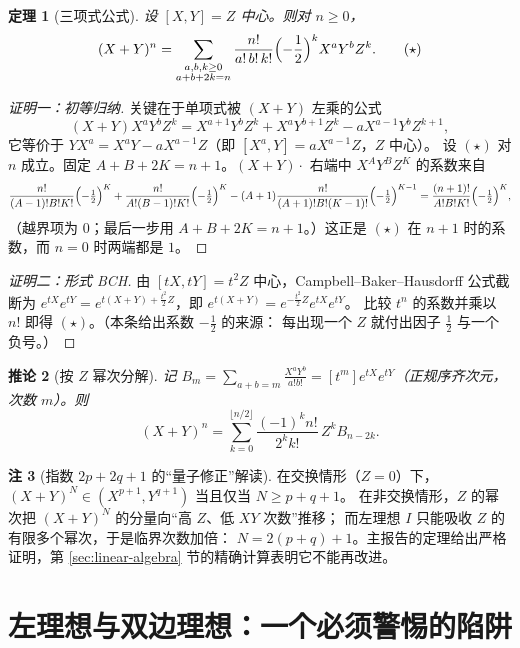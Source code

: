 \documentclass[11pt,UTF8]{ctexart}
\newtheorem{theorem}{定理}[section]
\newtheorem{corollary}[theorem]{推论}
\theoremstyle{definition}
\newtheorem{remark}[theorem]{注}
\begin{document}
\begin{theorem}[三项式公式]\label{thm:tri}
设 $[X,Y]=Z$ 中心。则对 $n\ge0$，
\[
(X+Y)^{n}=\sum_{\substack{a,b,k\ge0\\ a+b+2k=n}}\frac{n!}{a!\,b!\,k!}\Bigl(-\frac12\Bigr)^{k}X^{a}Y^{b}Z^{k}.
\tag{$\star$}
\]
\end{theorem}

\begin{proof}[证明一：初等归纳]
关键在于单项式被 $(X+Y)$ 左乘的公式
\[
(X+Y)X^{a}Y^{b}Z^{k}=X^{a+1}Y^{b}Z^{k}+X^{a}Y^{b+1}Z^{k}-aX^{a-1}Y^{b}Z^{k+1},
\]
它等价于 $YX^{a}=X^{a}Y-aX^{a-1}Z$（即 $[X^a,Y]=aX^{a-1}Z$，$Z$ 中心）。
设 $(\star)$ 对 $n$ 成立。固定 $A+B+2K=n+1$。$(X+Y)\cdot$ 右端中 $X^{A}Y^{B}Z^{K}$ 的系数来自
\[
\frac{n!}{(A-1)!B!K!}\Bigl(-\tfrac12\Bigr)^{K}
+\frac{n!}{A!(B-1)!K!}\Bigl(-\tfrac12\Bigr)^{K}
-(A+1)\frac{n!}{(A+1)!B!(K-1)!}\Bigl(-\tfrac12\Bigr)^{K-1}
=\frac{(n+1)!}{A!B!K!}\Bigl(-\tfrac12\Bigr)^{K},
\]
（越界项为 $0$；最后一步用 $A+B+2K=n+1$。）这正是 $(\star)$ 在 $n+1$ 时的系数，而 $n=0$ 时两端都是 $1$。
\end{proof}

\begin{proof}[证明二：形式 BCH]
由 $[tX,tY]=t^2Z$ 中心，Campbell--Baker--Hausdorff 公式截断为
$e^{tX}e^{tY}=e^{t(X+Y)+\frac{t^{2}}{2}Z}$，即 $e^{t(X+Y)}=e^{-\frac{t^{2}}{2}Z}e^{tX}e^{tY}$。
比较 $t^{n}$ 的系数并乘以 $n!$ 即得 $(\star)$。（本条给出系数 $-\frac12$ 的来源：
每出现一个 $Z$ 就付出因子 $\frac12$ 与一个负号。）
\end{proof}

\begin{corollary}[按 $Z$ 幂次分解]\label{cor:zdecomp}
记 $B_m=\sum_{a+b=m}\frac{X^{a}Y^{b}}{a!b!}=[t^{m}]e^{tX}e^{tY}$（正规序齐次元，次数 $m$）。则
\[
(X+Y)^{n}=\sum_{k=0}^{\lfloor n/2\rfloor}\frac{(-1)^{k}n!}{2^{k}k!}\,Z^{k}B_{n-2k}.
\]
\end{corollary}

\begin{remark}[指数 $2p+2q+1$ 的“量子修正”解读]
在交换情形（$Z=0$）下，$(X+Y)^{N}\in(X^{p+1},Y^{q+1})$ 当且仅当 $N\ge p+q+1$。
在非交换情形，$Z$ 的幂次把 $(X+Y)^N$ 的分量向“高 $Z$、低 $XY$ 次数”推移；
而左理想 $I$ 只能吸收 $Z$ 的有限多个幂次，于是临界次数加倍：
$N=2(p+q)+1$。主报告的定理给出严格证明，第 \ref{sec:linear-algebra} 节的精确计算表明它不能再改进。
\end{remark}

\section{左理想与双边理想：一个必须警惕的陷阱}\label{sec:onesided}
\end{document}

